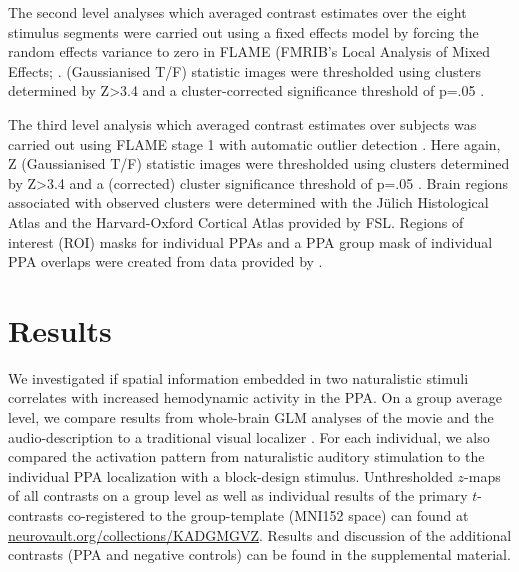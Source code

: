 \documentclass[english]{article}
\begin{document}
The second level analyses which averaged contrast estimates over the eight
stimulus segments were carried out using a fixed effects model by forcing the
random effects variance to zero in FLAME (FMRIB's Local Analysis of Mixed
Effects; \citep{beckmann2003general, woolrich2004multilevel}.
(Gaussianised T/F) statistic images were thresholded using clusters determined
by Z>3.4 and a cluster-corrected significance threshold of p=.05
\citep{worsley2001statistical}.

The third level analysis which averaged contrast estimates over subjects was
carried out using FLAME stage 1 with automatic outlier detection
\citep{beckmann2003general, woolrich2004multilevel, woolrich2008robust}.
Here again, Z (Gaussianised T/F) statistic images were thresholded using
clusters determined by Z>3.4 and a (corrected) cluster significance threshold of
p=.05 \citep{worsley2001statistical}.
Brain regions associated with observed clusters were determined with the Jülich
Histological Atlas \citep{eickhoff2005toolbox, eickhoff2007assignment} and the
Harvard-Oxford Cortical Atlas \citep{desikan2006automated} provided by FSL.
Regions of interest (ROI) masks for individual PPAs and a PPA group mask of
individual PPA overlaps were created from data provided by
\citep{sengupta2016extension}.


\section{Results}


We investigated if spatial information embedded in two naturalistic stimuli
correlates with increased hemodynamic activity in the PPA.
On a group average level, we compare results from whole-brain GLM
analyses of the movie and the audio-description to a
traditional visual localizer \citep{sengupta2016extension}.
For each individual, we also compared the activation pattern from
naturalistic auditory stimulation to the individual PPA localization
with a block-design stimulus.
Unthresholded $z$-maps of all contrasts on a group level as well as individual
results of the primary $t$-contrasts co-registered to the group-template (MNI152
space) can found at
\href{https://neurovault.org/collections/KADGMGVZ/}{\url{neurovault.org/collections/KADGMGVZ}}.
Results and discussion of the additional contrasts (PPA and negative controls)
can be found in the supplemental material. 
\end{document}

